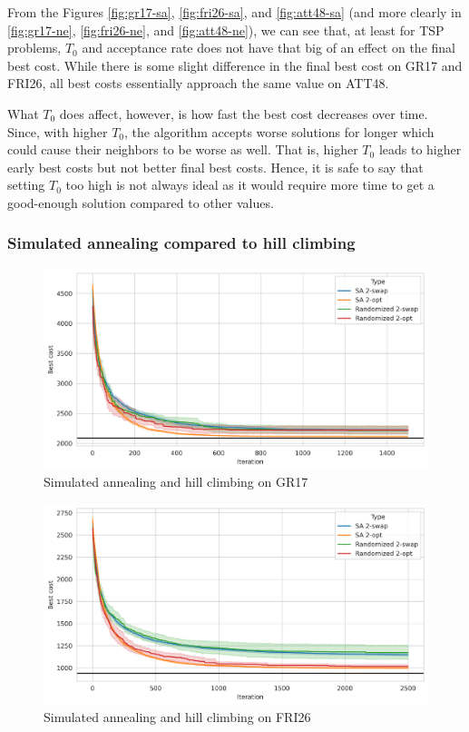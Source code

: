 From the Figures \ref{fig:gr17-sa}, \ref{fig:fri26-sa}, and \ref{fig:att48-sa} (and more clearly in \ref{fig:gr17-ne}, \ref{fig:fri26-ne}, and \ref{fig:att48-ne}), we can see that, at least for TSP problems, \(T_0\) and acceptance rate does not have that big of an effect on the final best cost. While there is some slight difference in the final best cost on GR17 and FRI26, all best costs essentially approach the same value on ATT48.

What \(T_0\) does affect, however, is how fast the best cost decreases over time. Since, with higher \(T_0\), the algorithm accepts worse solutions for longer which could cause their neighbors to be worse as well. That is, higher \(T_0\) leads to higher early best costs but not better final best costs. Hence, it is safe to say that setting \(T_0\) too high is not always ideal as it would require more time to get a good-enough solution compared to other values.

\subsubsection*{Simulated annealing compared to hill climbing}

\begin{figure}
    \centering
    \includegraphics[height=0.27\textheight]{images/gr17-with-hc.png}
    \caption{Simulated annealing and hill climbing on GR17}
    \label{fig:gr17}
\end{figure}

\begin{figure}
    \centering
    \includegraphics[height=0.27\textheight]{images/fri26-with-hc.png}
    \caption{Simulated annealing and hill climbing on FRI26}
    \label{fig:fri26}
\end{figure}

